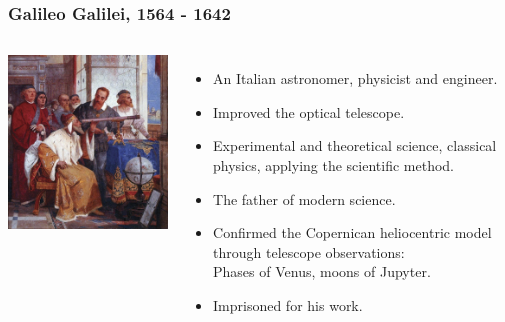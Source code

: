 \documentclass[aspectratio=169,xcolor=pdftex,dvipsnames]{beamer} %
\begin{document}
\begin{frame}
\frametitle{Galileo Galilei, 1564 - 1642}


\begin{columns}
        
      \includegraphics[width=75mm]{galileo.jpg}

\begin{itemize}
\item
An Italian astronomer, physicist and engineer.
\item 
Improved the optical telescope.
\item
Experimental and theoretical science, classical physics, applying the scientific method.
\item
The father of modern science.
\item
Confirmed the Copernican heliocentric model through telescope observations:\\
Phases of Venus, moons of Jupyter.
\item
Imprisoned for his work.
\end{itemize}
\end{columns} 

\end{frame}
\end{document}
